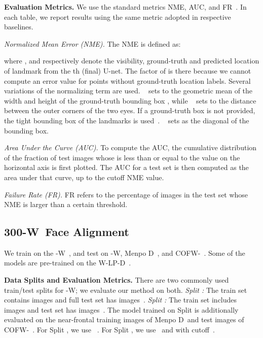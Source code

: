 \documentclass[10pt,twocolumn,letterpaper]{article}
\newcommand{\threehundredW}{-W}
\newcommand{\threehundredLP}{W-LP-D}
\newcommand{\menpoTwoD}{Menpo D}
\newcommand{\cofwSixtyEight}{COFW-}
\newcommand{\threehundredWHeading}{300-W}
\newcommand{\nmebox}{}
\newcommand{\nmediag}{}
\newcommand{\nmeocular}{}
\newcommand{\1}{{\bf 1}}
\newcommand{\0}{{\bf 0}}
\begin{document}
\textbf{Evaluation Metrics.}
    We use the standard metrics NME, AUC, and FR~\cite{tang2019towards, chen2019face, wang2019adaptive}. In each table, we report results using the same  metric adopted in respective baselines.
        
        \textit{Normalized Mean Error (NME).} The NME is defined as:
        
        where ,  and  respectively denote the visibility, ground-truth and predicted location of landmark  from the th (final) U-net. The factor of  is there because we cannot compute an error value for points without ground-truth location labels. Several variations of the normalizing term  are used.  \nmebox~\cite{zafeiriou2017menpo, bulat2017far, chen2019face} sets  to the geometric mean of the width and height of the ground-truth bounding box , while \nmeocular~\cite{sagonas2013300, kowalski2017deep, tang2019towards} sets  to the distance between the outer corners of the two eyes. If a ground-truth box is not provided, the tight bounding box of the landmarks is used~\cite{bulat2017far, chen2019face}. \nmediag~\cite{wu2018look, sun2019high} sets  as the diagonal of the bounding box. 
    
        \textit{Area Under the Curve (AUC).} To compute the AUC, the cumulative distribution of the fraction of test images whose  is less than or equal to the value on the horizontal axis is first plotted. The AUC for a test set is then computed as the area under that curve, up to the cutoff NME value.

        \textit{Failure Rate (FR).} FR refers to the percentage of images in the test set whose NME is larger than a certain threshold.


\subsection{\threehundredWHeading~Face Alignment}
    \label{sec:300w}
    \vspace{-0.15cm}
        We train on the \threehundredW~\cite{sagonas2013300, sagonas2016300, sagonas2013semi}, and test on \threehundredW, \menpoTwoD~\cite{zafeiriou2017menpo, trigeorgis2016mnemonic, deng2019menpo}, and \cofwSixtyEight~\cite{burgos2013robust, ghiasi2015occlusion}. Some of the models are pre-trained on the \threehundredLP~\cite{zhu2016face}.

\textbf{Data Splits and Evaluation Metrics.}\label{sec_split}
        There are two commonly used train/test splits for \threehundredW; we evaluate our method on both. \textit{Split :} The train set contains  images and full test set has  images~\cite{tang2019towards}. \textit{Split :} The train set includes  images and test set has  images~\cite{chen2019face}. The model trained on Split  is additionally evaluated on the  near-frontal training images of \menpoTwoD~and  test images of \cofwSixtyEight~\cite{chen2019face}. For Split , we use \nmeocular~\cite{tang2019towards, sun2019high, wang2019adaptive}. For Split , we use \nmebox~and  with   cutoff~\cite{bulat2017far, chen2019face}.
\end{document}
